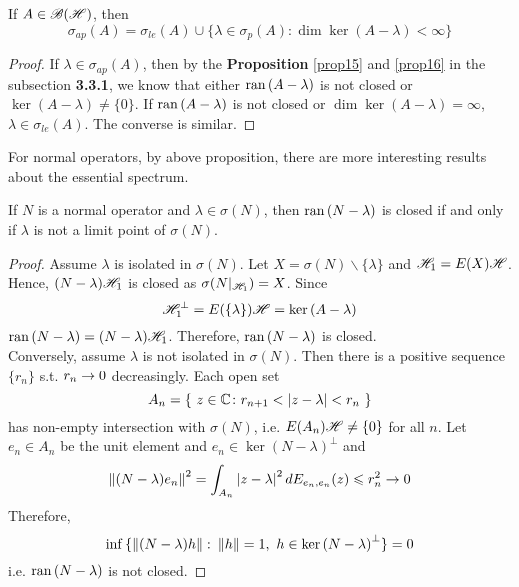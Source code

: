 \documentclass[a4paper,11pt]{report}
\begin{document}
\begin{prop}
	If $A \in \mathscr{B(H)}$, then
	\begin{equation*}
		\sigma_{ap}(A) = \sigma_{le}(A) \cup \{\lambda \in \sigma_p(A) \colon \dim{\ker{(A-\lambda)}} < \infty\}
	\end{equation*}
\end{prop}
\begin{proof}
	If $\lambda \in \sigma_{ap}(A)$, then by the \textbf{Proposition} \ref{prop15} and \ref{prop16} in the subsection \textbf{3.3.1}, we know that either $\operatorname{ran}{(A-\lambda)}$ is not closed or $\ker{(A-\lambda)} \neq \{0\}$. If $\operatorname{ran}{(A-\lambda)}$ is not closed or $\dim{\ker{(A-\lambda)}} = \infty$, $\lambda \in \sigma_{le}(A)$. The converse is similar.
\end{proof}

For normal operators, by above proposition, there are more interesting results about the essential spectrum.

\begin{lem}
	If $N$ is a normal operator and $\lambda \in \sigma(N)$, then $\operatorname{ran}{(N-\lambda)}$ is closed if and only if $\lambda$ is not a limit point of $\sigma(N)$.
\end{lem}
\begin{proof}
	Assume $\lambda$ is isolated in $\sigma(N)$. Let $X = \sigma(N) \backslash \{\lambda\}$ and $\mathscr{H}_1 = E(X) \mathscr{H}$. Hence, $(N-\lambda)\mathscr{H}_1$ is closed as $\sigma(N|_{\mathscr{H}_1}) = X$. Since
	\begin{equation*}
		\mathscr{H}_1^{\bot} = E(\{\lambda\}) \mathscr{H} = \ker{(A-\lambda)}
	\end{equation*}
	$\operatorname{ran}{(N-\lambda)} = (N-\lambda)\mathscr{H}_1$. Therefore, $\operatorname{ran}{(N-\lambda)}$ is closed. \\
	Conversely, assume $\lambda$ is not isolated in $\sigma(N)$. Then there is a positive sequence $\{r_n\}$ s.t. $r_n \rightarrow 0$ decreasingly. Each open set
	\begin{equation*}
		A_n = \{~z \in \mathbb{C} \colon r_{n+1} < \left\lvert z - \lambda\right\lvert < r_n~\}
	\end{equation*}
	has non-empty intersection with $\sigma(N)$, i.e. $E(A_n)\mathscr{H} \neq \{0\}$ for all $n$. Let $e_n \in A_n$ be the unit element and $e_n \in \ker{(N-\lambda)}^{\bot}$ and
	\begin{equation*}
		\left\lVert(N-\lambda)e_n\right\lVert^2 = \int_{A_n} \left\lvert z-\lambda\right\lvert^2 d E_{e_n,e_n}(z) \leqslant r_n^2 \rightarrow 0
	\end{equation*}
	Therefore,
	\begin{equation*}
		\inf{\{\left\lVert(N-\lambda)h\right\lVert \colon \left\lVert h\right\lVert = 1,~h \in \ker{(N-\lambda)}^{\bot}\}} = 0
	\end{equation*}
	i.e. $\operatorname{ran}{(N-\lambda)}$ is not closed.
\end{proof}
\end{document}

